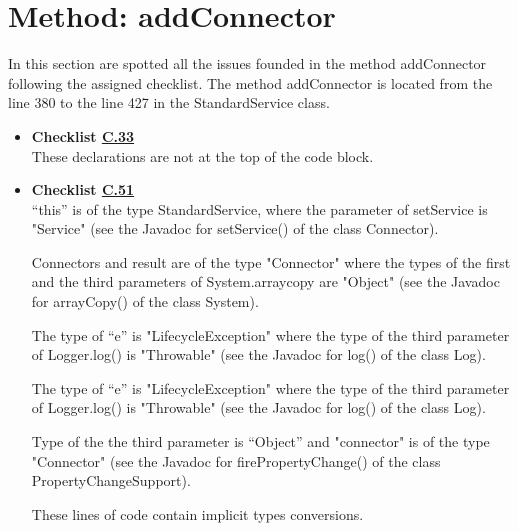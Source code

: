 \documentclass[../../../../codeInspection.tex]{subfiles}
\begin{document}
	\section{Method: addConnector}

		In this section are spotted all the issues founded in the method addConnector following the assigned checklist.
		The method addConnector is located from the line 380 to the line 427 in the StandardService class.

		\begin{itemize}
			\item \textbf{Checklist \hyperref[C:33]{C.33}} \\

				  

				  These declarations are not at the top of the code block.

			\item \textbf{Checklist \hyperref[C:51]{C.51}} \\

				  

				  “this” is of the type StandardService, where the parameter of setService is "Service"
				  (see the Javadoc for setService() of the class Connector).

				  

				  Connectors and result are of the type "Connector" where the types of the first and the third parameters of System.arraycopy are "Object" (see the Javadoc for arrayCopy() of the class System).

				  

				  The type of “e” is "LifecycleException" where the type of the third parameter of Logger.log() is "Throwable" (see the Javadoc for log() of the class Log).

				  

				  The type of “e” is "LifecycleException" where the type of the third parameter of Logger.log() is "Throwable" (see the Javadoc for log() of the class Log).

				  

				  Type of the the third parameter is “Object” and "connector" is of the type "Connector" (see the Javadoc for firePropertyChange() of the class PropertyChangeSupport).

				  These lines of code contain implicit types conversions.

		\end{itemize}
\end{document}
